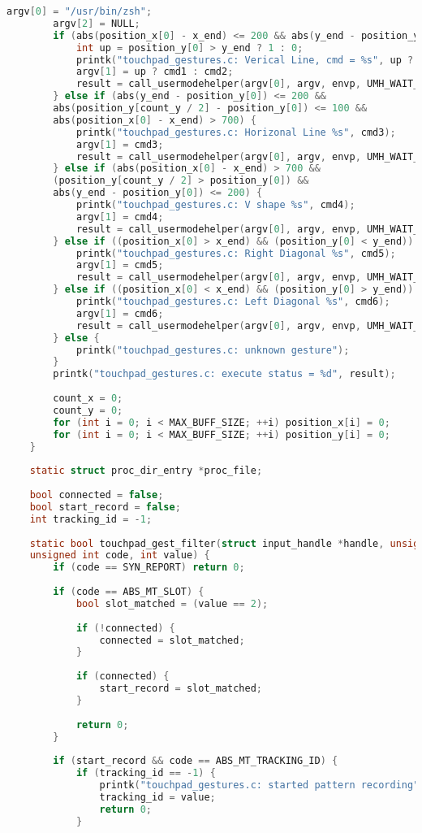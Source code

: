 \begin{lstlisting}[label=lst:module,caption=Реализация загружаемого модуля ядра, language=c]
		argv[0] = "/usr/bin/zsh";
		argv[2] = NULL;
		if (abs(position_x[0] - x_end) <= 200 && abs(y_end - position_y[0]) > 700) {
			int up = position_y[0] > y_end ? 1 : 0;
			printk("touchpad_gestures.c: Verical Line, cmd = %s", up ? cmd1 : cmd2);
			argv[1] = up ? cmd1 : cmd2;
			result = call_usermodehelper(argv[0], argv, envp, UMH_WAIT_PROC);
		} else if (abs(y_end - position_y[0]) <= 200 &&
		abs(position_y[count_y / 2] - position_y[0]) <= 100 &&
		abs(position_x[0] - x_end) > 700) {
			printk("touchpad_gestures.c: Horizonal Line %s", cmd3);
			argv[1] = cmd3;
			result = call_usermodehelper(argv[0], argv, envp, UMH_WAIT_PROC);
		} else if (abs(position_x[0] - x_end) > 700 &&
		(position_y[count_y / 2] > position_y[0]) &&
		abs(y_end - position_y[0]) <= 200) {
			printk("touchpad_gestures.c: V shape %s", cmd4);
			argv[1] = cmd4;
			result = call_usermodehelper(argv[0], argv, envp, UMH_WAIT_PROC);
		} else if ((position_x[0] > x_end) && (position_y[0] < y_end)) {
			printk("touchpad_gestures.c: Right Diagonal %s", cmd5);
			argv[1] = cmd5;
			result = call_usermodehelper(argv[0], argv, envp, UMH_WAIT_PROC);
		} else if ((position_x[0] < x_end) && (position_y[0] > y_end)) {
			printk("touchpad_gestures.c: Left Diagonal %s", cmd6);
			argv[1] = cmd6;
			result = call_usermodehelper(argv[0], argv, envp, UMH_WAIT_PROC);
		} else {
			printk("touchpad_gestures.c: unknown gesture");
		}
		printk("touchpad_gestures.c: execute status = %d", result);
		
		count_x = 0;
		count_y = 0;
		for (int i = 0; i < MAX_BUFF_SIZE; ++i) position_x[i] = 0;
		for (int i = 0; i < MAX_BUFF_SIZE; ++i) position_y[i] = 0;
	}
	
	static struct proc_dir_entry *proc_file;
	
	bool connected = false;
	bool start_record = false;
	int tracking_id = -1;
	
	static bool touchpad_gest_filter(struct input_handle *handle, unsigned int type,
	unsigned int code, int value) {
		if (code == SYN_REPORT) return 0;
		
		if (code == ABS_MT_SLOT) {
			bool slot_matched = (value == 2);
			
			if (!connected) {
				connected = slot_matched;
			}
			
			if (connected) {
				start_record = slot_matched;
			}
			
			return 0;
		}
		
		if (start_record && code == ABS_MT_TRACKING_ID) {
			if (tracking_id == -1) {
				printk("touchpad_gestures.c: started pattern recording");
				tracking_id = value;
				return 0;
			}
			

\end{lstlisting}
